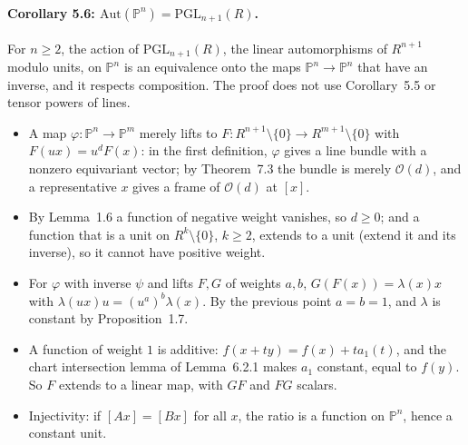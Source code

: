\documentclass[11pt]{article}
\theoremstyle{remark}
\begin{document}
\paragraph{Corollary 5.6: $\mathrm{Aut}(\mathbb P^n)=\mathrm{PGL}_{n+1}(R)$.}
For $n\ge2$, the action of $\mathrm{PGL}_{n+1}(R)$, the linear automorphisms of
$R^{n+1}$ modulo units, on $\mathbb P^n$ is an equivalence onto the maps
$\mathbb P^n\to\mathbb P^n$ that have an inverse, and it respects
composition. The proof does not use Corollary~5.5 or tensor powers of
lines.
\begin{itemize}
\item A map $\varphi:\mathbb P^n\to\mathbb P^m$ merely lifts to
  $F:R^{n+1}\setminus\{0\}\to R^{m+1}\setminus\{0\}$ with
  $F(ux)=u^dF(x)$: in the first definition, $\varphi$ gives a line
  bundle with a nonzero equivariant vector; by Theorem~7.3 the bundle is
  merely $\mathcal O(d)$, and a representative $x$ gives a frame of
  $\mathcal O(d)$ at $[x]$.
\item By Lemma~1.6 a function of negative weight vanishes, so $d\ge0$; and
  a function that is a unit on $R^{k}\setminus\{0\}$, $k\ge2$, extends to a
  unit (extend it and its inverse), so it cannot have positive weight.
\item For $\varphi$ with inverse $\psi$ and lifts $F,G$ of weights $a,b$,
  $G(F(x))=\lambda(x)x$ with $\lambda(ux)u=(u^a)^b\lambda(x)$. By the
  previous point $a=b=1$, and $\lambda$ is constant by Proposition~1.7.
\item A function of weight $1$ is additive: $f(x+ty)=f(x)+ta_1(t)$, and
  the chart intersection lemma of Lemma~6.2.1 makes $a_1$ constant,
  equal to $f(y)$. So $F$ extends to a linear map, with $GF$ and $FG$
  scalars.
\item Injectivity: if $[Ax]=[Bx]$ for all $x$, the ratio is a function on
  $\mathbb P^n$, hence a constant unit.
\end{itemize}
\end{document}
